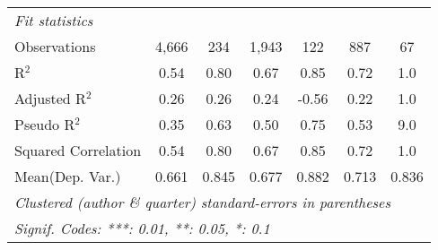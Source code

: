 \begin{tabular}{lcccccc}
   \midrule
   \emph{Fit statistics}\\
   Observations                                               & 4,666          & 234        & 1,943         & 122          & 887            & 67\\  
   R$^2$                                                      & 0.54           & 0.80       & 0.67          & 0.85         & 0.72           & 1.0\\  
   Adjusted R$^2$                                             & 0.26           & 0.26       & 0.24          & -0.56        & 0.22           & 1.0\\  
   Pseudo R$^2$                                               & 0.35           & 0.63       & 0.50          & 0.75         & 0.53           & 9.0\\  
   Squared Correlation                                        & 0.54           & 0.80       & 0.67          & 0.85         & 0.72           & 1.0\\  
Mean(Dep. Var.) & 0.661 & 0.845 & 0.677 & 0.882 & 0.713 & 0.836 \\
   \midrule \midrule
   \multicolumn{7}{l}{\emph{Clustered (author \& quarter) standard-errors in parentheses}}\\
   \multicolumn{7}{l}{\emph{Signif. Codes: ***: 0.01, **: 0.05, *: 0.1}}\\
\end{tabular}
\par\endgroup
